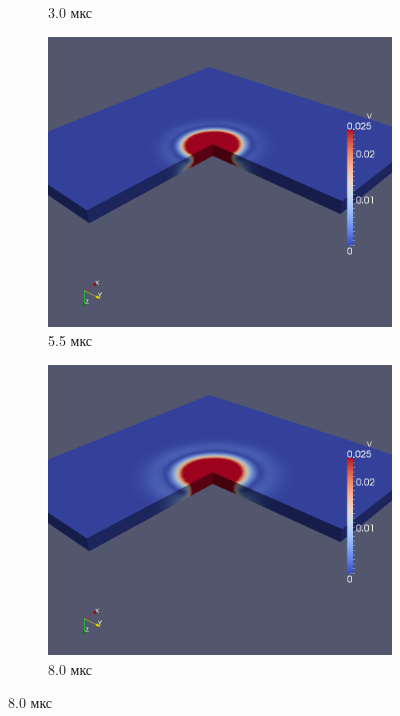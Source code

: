 \begin{figure}[htp]
\begin{subfigure}[b]{0.5\textwidth}
\caption{3.0 мкс}
\end{subfigure}
\begin{subfigure}[b]{0.5\textwidth}
\centering
\includegraphics[width=\textwidth]{png/pkm-experiment/wing-only/wave-3d/v-0009.png}
\caption{5.5 мкс}
\end{subfigure}
\begin{subfigure}[b]{0.5\textwidth}
\centering
\includegraphics[width=\textwidth]{png/pkm-experiment/wing-only/wave-3d/v-0013.png}
\caption{8.0 мкс}
\end{subfigure}

\end{figure}
